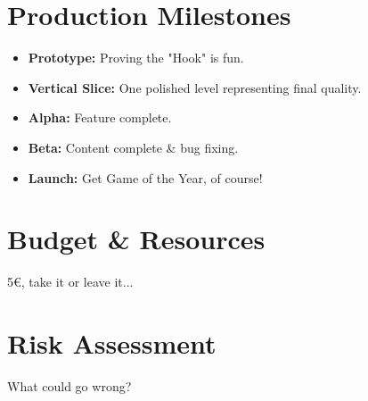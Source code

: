 \section{Production Milestones}

\begin{itemize}
	\item \textbf{Prototype:} Proving the "Hook" is fun.
	\item \textbf{Vertical Slice:} One polished level representing final quality.
	\item \textbf{Alpha:} Feature complete.
	\item \textbf{Beta:} Content complete \& bug fixing.
	\item \textbf{Launch:} Get Game of the Year, of course!
\end{itemize}

\lipsum[28]

\section{Budget \& Resources}

5€, take it or leave it...

\lipsum[29]

\section{Risk Assessment}

What could go wrong?

\lipsum[30]